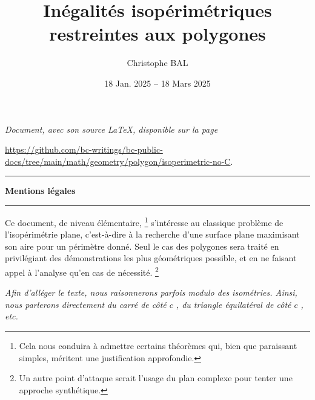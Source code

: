 \documentclass[12pt]{amsart}
\begin{document}
\title{Inégalités isopérimétriques restreintes aux polygones}
\author{Christophe BAL}
\date{18 Jan. 2025 -- 18 Mars 2025}

\maketitle

\begin{center}
	\itshape
	Document, avec son source \LaTeX, disponible sur la page

	\url{https://github.com/bc-writings/bc-public-docs/tree/main/math/geometry/polygon/isoperimetric-no-C}.
\end{center}


\bigskip


\begin{center}
	\hrule\vspace{.3em}
	{
		\fontsize{1.35em}{1em}\selectfont
		\textbf{Mentions \og légales \fg}
	}

	\vspace{0.45em}
	\doclicenseThis
	\hrule
\end{center}



\setcounter{tocdepth}{2}
\tableofcontents




\newpage

\begin{meta-abstract*}
	Ce document, de niveau élémentaire,%
	\footnote{
    	Cela nous conduira à admettre certains théorèmes qui, bien que paraissant simples, méritent une justification approfondie.
	}
	s'intéresse au classique problème de l'isopérimétrie plane, c'est-à-dire à la recherche d'une surface plane maximisant son aire pour un périmètre donné.
	Seul le cas des polygones sera traité en privilégiant des démonstrations les plus géométriques possible, et en ne faisant appel à l'analyse qu'en cas de nécessité.%
	\footnote{
    	Un autre point d'attaque serait l'usage du plan complexe pour tenter une approche synthétique.
	}
\end{meta-abstract*}


\begin{tcolorbox}
    \itshape\small
    Afin d'alléger le texte, nous raisonnerons parfois modulo des isométries. Ainsi, nous parlerons directement du \og carré de côté \( c \) \fg, du \og triangle équilatéral de côté \( c \) \fg, etc.
\end{tcolorbox}


\end{document}
